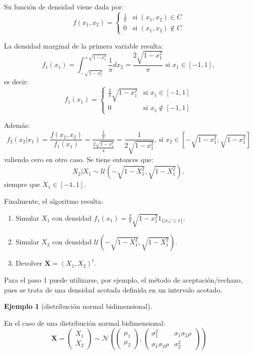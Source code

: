 \documentclass[
]{book}
\theoremstyle{break}
\theoremstyle{definition}
\theoremstyle{definition}
\newtheorem{example}{Ejemplo}[chapter]
\theoremstyle{definition}
\theoremstyle{definition}
\theoremstyle{remark}
\begin{document}
Su función de densidad viene dada por:
\[f\left( x_1,x_2\right)  =\left\{
\begin{array}{ll}
\frac{1}{\pi} & \text{si } \left( x_1,x_2\right)  \in C\\
0 & \text{si } \left( x_1,x_2\right)  \notin C
\end{array}\right.\]

La densidad marginal de la primera variable resulta:
\[f_1\left( x_1\right)  =\int_{-\sqrt{1-x_1^2}}^{+\sqrt{1-x_1^2}}\frac{1}{\pi}dx_2
=\frac{2\sqrt{1-x_1^2}}{\pi}
\text{ si }x_1\in\left[-1,1\right],\]
es decir:
\[f_1\left( x_1\right)  =\left\{
\begin{array}{ll}
\frac{2}{\pi}\sqrt{1-x_1^2} & \text{si } x_1\in\left[  -1,1\right]  \\
0 & \text{si } x_1\notin\left[ -1,1\right]  
\end{array}\right.\]

Además:
\[f_2\left( x_2|x_1\right) = \frac{f\left( x_1,x_2\right)  }{f_1\left( x_1\right)} = \frac{\frac{1}{\pi}}{\frac{2\sqrt{1-x_1^2}}{\pi}}=\frac{1}{2\sqrt{1-x_1^2}}\text{, si }x_2\in\left[
-\sqrt{1-x_1^2},\sqrt{1-x_1^2}\right]\]
valiendo cero en otro caso.
Se tiene entonces que:
\[X_2|X_1 \sim \mathcal{U}\left(  -\sqrt{1-X_1^2},\sqrt{1-X_1^2}\right),\]
siempre que \(X_1\in\left[ -1,1\right]\).

Finalmente, el algoritmo resulta:

\begin{enumerate}
\def\labelenumi{\arabic{enumi}.}
\item
  Simular \(X_1\) con densidad \(f_1\left( x_1\right) =\frac{2}{\pi}\sqrt{1-x_1^2}1_{\{|x_1|\leq1\}}\).
\item
  Simular \(X_2\) con densidad \(\mathcal{U}\left( -\sqrt{1-X_1^2},\sqrt{1-X_1^2}\right)\).
\item
  Devolver \(\mathbf{X}=\left( X_1,X_2\right) ^t\).
\end{enumerate}

Para el paso 1 puede utilizarse, por ejemplo, el método de
aceptación/rechazo, pues se trata de una densidad acotada definida en un
intervalo acotado.

\begin{example}[distribución normal bidimensional]
\protect\hypertarget{exm:unnamed-chunk-9}{}{\label{exm:unnamed-chunk-9} {} }
\end{example}

En el caso de una distribución normal bidimensional:
\[\mathbf{X} = \begin{pmatrix}
 X_1 \\
 X_2
\end{pmatrix}  
\sim \mathcal{N} \left( \begin{pmatrix}
 \mu_1 \\
 \mu_2
\end{pmatrix} , 
\begin{pmatrix}
 \sigma^2_1 &  \sigma_1 \sigma_2 \rho \\
 \sigma_1 \sigma_2 \rho &  \sigma^2_2
\end{pmatrix} \right)\]
\end{document}
